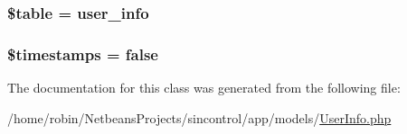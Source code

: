 \subsubsection[{\$table}]{\setlength{\rightskip}{0pt plus 5cm}\$table = \textquotesingle{}user\+\_\+info\textquotesingle{}\hspace{0.3cm}{\ttfamily [protected]}}\label{class_user_info_ae8876a14058f368335baccf35af4a22b}
\hypertarget{class_user_info_a51267c24c8fae742ed8f9be0ba6085ee}{}
\subsubsection[{\$timestamps}]{\setlength{\rightskip}{0pt plus 5cm}\$timestamps = false}\label{class_user_info_a51267c24c8fae742ed8f9be0ba6085ee}


The documentation for this class was generated from the following file\+:\begin{DoxyCompactItemize}
\item 
/home/robin/\+Netbeans\+Projects/sincontrol/app/models/\hyperlink{_user_info_8php}{User\+Info.\+php}\end{DoxyCompactItemize}
